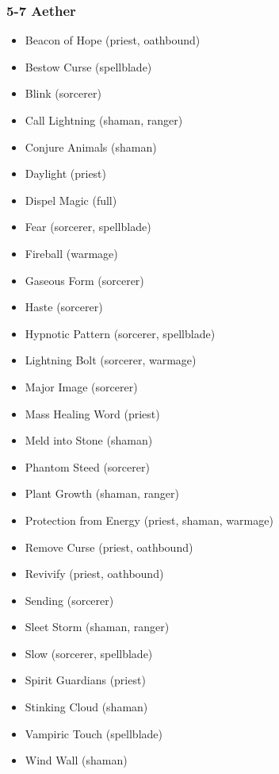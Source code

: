 \subsubsection{5-7 Aether}
\begin{itemize}
\item Beacon of Hope (priest, oathbound)
\item Bestow Curse (spellblade)
\item Blink (sorcerer)
\item Call Lightning (shaman, ranger)
\item Conjure Animals (shaman)
\item Daylight (priest)
\item Dispel Magic (full)
\item Fear (sorcerer, spellblade)
\item Fireball (warmage)
\item Gaseous Form (sorcerer)
\item Haste (sorcerer)
\item Hypnotic Pattern (sorcerer, spellblade)
\item Lightning Bolt (sorcerer, warmage)
\item Major Image (sorcerer)
\item Mass Healing Word (priest)
\item Meld into Stone (shaman)
\item Phantom Steed (sorcerer)
\item Plant Growth (shaman, ranger)
\item Protection from Energy (priest, shaman, warmage)
\item Remove Curse (priest, oathbound)
\item Revivify (priest, oathbound)
\item Sending (sorcerer)
\item Sleet Storm (shaman, ranger)
\item Slow (sorcerer, spellblade)
\item Spirit Guardians (priest)
\item Stinking Cloud (shaman)
\item Vampiric Touch (spellblade)
\item Wind Wall (shaman)
\end{itemize}

